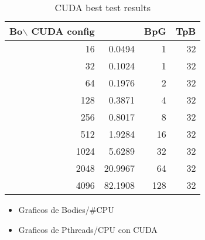     \begin{table}[h!]
        \centering
        \small
        \begin{tabular}{|r|r|r|r|}
            \hline
            Bo$\backslash$ CUDA config & & BpG & TpB \\ \hline
            16    &   0.0494   &   1  &  32 \\\hline
            32    &   0.1024   &   1  &  32 \\\hline
            64    &   0.1976   &   2  &  32 \\\hline
            128   &   0.3871   &   4  &  32 \\\hline
            256   &   0.8017   &   8  &  32 \\\hline
            512   &   1.9284   &  16  &  32 \\\hline
            1024  &   5.6289   &  32  &  32 \\\hline
            2048  &  20.9967   &  64  &  32 \\\hline
            4096  &  82.1908   & 128  &  32 \\\hline
        \end{tabular}
        \caption{CUDA best test results}
        \label{tab:cuda}
    \end{table}


\begin{itemize}
    \item Graficos de Bodies/#CPU
    \item Graficos de Pthreads/CPU con CUDA
\end{itemize}
